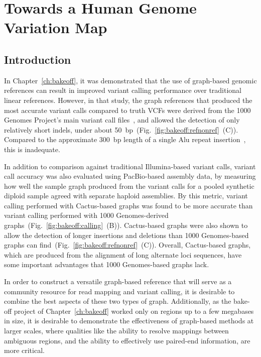 \chapter{Towards a Human Genome Variation Map}
\label{ch:hgvm}

\section{Introduction}

In Chapter~\ref{ch:bakeoff}, it was demonstrated that the use of graph-based genomic references can result in improved variant calling performance over traditional linear references. However, in that study, the graph references that produced the most accurate variant calls compared to truth VCFs were derived from the 1000 Genomes Project's main variant call files~\cite{10002015global}, and allowed the detection of only relatively short indels, under about 50~bp~(Fig.~\ref{fig:bakeoff:refnonref}~(C)). Compared to the approximate 300~bp length of a single Alu repeat insertion~\cite{weiner1980abundant}, this is inadequate.

In addition to comparison against traditional Illumina-based variant calls, variant call accuracy was also evaluated using PacBio-based assembly data, by measuring how well the sample graph produced from the variant calls for a pooled synthetic diploid sample agreed with separate haploid assemblies. By this metric, variant calling performed with Cactus-based graphs was found to be more accurate than variant calling performed with 1000 Genomes-derived graphs~(Fig.~\ref{fig:bakeoff:calling}~(B)). Cactus-based graphs were also shown to allow the detection of longer insertions and deletions than 1000 Genomes-based graphs can find~(Fig.~\ref{fig:bakeoff:refnonref}~(C)). Overall, Cactus-based graphs, which are produced from the alignment of long alternate loci sequences, have some important advantages that 1000 Genomes-based graphs lack.

In order to construct a versatile graph-based reference that will serve as a community resource for read mapping and variant calling, it is desirable to combine the best aspects of these two types of graph. Additionally, as the bake-off project of Chapter~\ref{ch:bakeoff} worked only on regions up to a few megabases in size, it is desirable to demonstrate the effectiveness of graph-based methods at larger scales, where qualities like the ability to resolve mappings between ambiguous regions, and the ability to effectively use paired-end information, are more critical.

